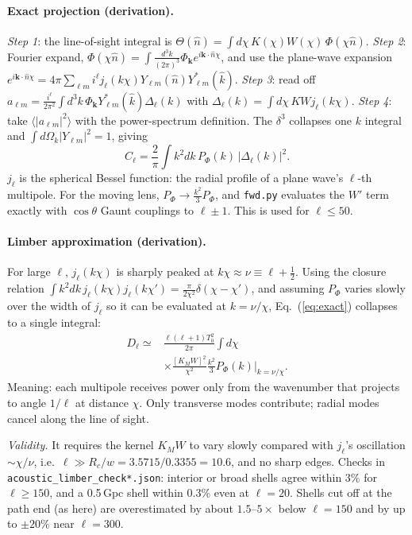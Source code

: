 \documentclass[10pt,twocolumn]{article}
\newcommand{\why}[1]{\par\noindent\textit{Validity.} #1\par}
\begin{document}
\paragraph{Exact projection (derivation).} \emph{Step 1}: the line-of-sight integral is $\Theta(\hat n)=\int d\chi\,K(\chi)W(\chi)\,\Phi(\chi\hat n)$. \emph{Step 2}: Fourier expand, $\Phi(\chi\hat n)=\int\frac{d^3k}{(2\pi)^3}\Phi_{\mathbf k}e^{i\mathbf k\cdot\hat n\chi}$, and use the plane-wave expansion $e^{i\mathbf k\cdot\hat n\chi}=4\pi\sum_{\ell m}i^\ell j_\ell(k\chi)Y_{\ell m}(\hat n)Y^*_{\ell m}(\hat k)$. \emph{Step 3}: read off $a_{\ell m}=\frac{i^\ell}{2\pi^2}\int d^3k\,\Phi_{\mathbf k}Y^*_{\ell m}(\hat k)\Delta_\ell(k)$ with $\Delta_\ell(k)=\int d\chi\,KWj_\ell(k\chi)$. \emph{Step 4}: take $\langle|a_{\ell m}|^2\rangle$ with the power-spectrum definition. The $\delta^3$ collapses one $k$ integral and $\int d\Omega_k|Y_{\ell m}|^2=1$, giving
\begin{equation}
C_\ell=\frac{2}{\pi}\int k^2dk\,P_\Phi(k)\,|\Delta_\ell(k)|^2 .\label{eq:exact}
\end{equation}
$j_\ell$ is the spherical Bessel function: the radial profile of a plane wave's $\ell$-th multipole. For the moving lens, $P_\Phi\to\frac{k^2}{3}P_\Phi$, and \texttt{fwd.py} evaluates the $W'$ term exactly with $\cos\theta$ Gaunt couplings to $\ell\pm1$. This is used for $\ell\le50$.

\paragraph{Limber approximation (derivation).} For large $\ell$, $j_\ell(k\chi)$ is sharply peaked at $k\chi\approx\nu\equiv\ell+\tfrac12$. Using the closure relation $\int k^2dk\,j_\ell(k\chi)j_\ell(k\chi')=\frac{\pi}{2\chi^2}\delta(\chi-\chi')$, and assuming $P_\Phi$ varies slowly over the width of $j_\ell$ so it can be evaluated at $k=\nu/\chi$, Eq.~(\ref{eq:exact}) collapses to a single integral:
\begin{equation}\begin{split}
\label{eq:limber}D_\ell\simeq&\frac{\ell(\ell+1)T_0^2}{2\pi}\int d\chi\\
&\times\frac{[K_MW]^2}{\chi^2}\frac{k^2}{3}P_\Phi(k)\Big|_{k=\nu/\chi}.
\end{split}\end{equation}
Meaning: each multipole receives power only from the wavenumber that projects to angle $1/\ell$ at distance $\chi$. Only transverse modes contribute; radial modes cancel along the line of sight.
\why{It requires the kernel $K_MW$ to vary slowly compared with $j_\ell$'s oscillation $\sim\chi/\nu$, i.e.\ $\ell\gg R_c/w=3.5715/0.3355=10.6$, and no sharp edges. Checks in \texttt{acoustic\_limber\_check*.json}: interior or broad shells agree within 3\% for $\ell\ge150$, and a 0.5\,Gpc shell within 0.3\% even at $\ell=20$. Shells cut off at the path end (as here) are overestimated by about $1.5$--$5\times$ below $\ell=150$ and by up to $\pm20\%$ near $\ell=300$.}
\end{document}
